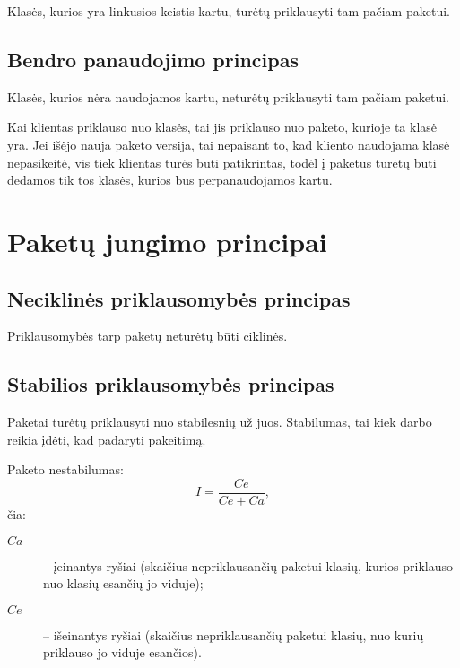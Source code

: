 \label{subsection:package:ccp}


Klasės, kurios yra linkusios keistis kartu, turėtų priklausyti
tam pačiam paketui.

\subsection{Bendro panaudojimo principas}

\label{subsection:package:crp}


Klasės, kurios nėra naudojamos kartu, neturėtų priklausyti tam
pačiam paketui.

Kai klientas priklauso nuo klasės, tai jis priklauso nuo paketo,
kurioje ta klasė yra. Jei išėjo nauja paketo versija, tai nepaisant
to, kad kliento naudojama klasė nepasikeitė, vis tiek klientas
turės būti patikrintas, todėl į paketus turėtų būti dedamos
tik tos klasės, kurios bus perpanaudojamos kartu.

\section{Paketų jungimo principai}

\subsection{Neciklinės priklausomybės principas}

\label{subsection:package:adp}


Priklausomybės tarp paketų neturėtų būti ciklinės.

\subsection{Stabilios priklausomybės principas}

\label{subsection:package:sdp}


Paketai turėtų priklausyti nuo stabilesnių už juos. Stabilumas, tai
kiek darbo reikia įdėti, kad padaryti pakeitimą.

Paketo nestabilumas:
\begin{equation*}
  I = \frac{Ce}{Ce + Ca},
\end{equation*}
čia:
\begin{description}
  \item[$Ca$] – įeinantys ryšiai (skaičius nepriklausančių paketui
    klasių, kurios priklauso nuo klasių esančių jo viduje);
  \item[$Ce$] – išeinantys ryšiai (skaičius nepriklausančių paketui
    klasių, nuo kurių priklauso jo viduje esančios).
\end{description}


